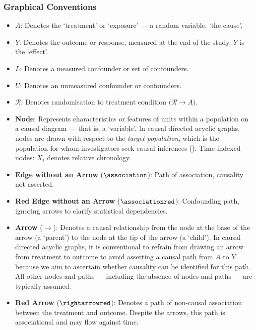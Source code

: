 \documentclass[
  single column]{article}
\begin{document}
\subsubsection{Graphical Conventions}\label{graphical-conventions}

\begin{itemize}
\item
  \textbf{\(A\)}: Denotes the `treatment' or `exposure' --- a random
  variable, `the cause'.
\item
  \textbf{\(Y\)}: Denotes the outcome or response, measured at the end
  of the study. \(Y\) is the `effect'.
\item
  \textbf{\(L\)}: Denotes a measured confounder or set of confounders.
\item
  \textbf{\(U\)}: Denotes an unmeasured confounder or confounders.
\item
  \textbf{\(\mathbf{\mathcal{R}}\)}: Denotes randomisation to treatment
  condition \(\big(\mathcal{R} \rightarrow A\big)\).
\item
  \textbf{Node}: Represents characteristics or features of units within
  a population on a causal diagram --- that is, a `variable'. In causal
  directed acyclic graphs, nodes are drawn with respect to the
  \emph{target population}, which is the population for whom
  investigators seek causal inferences (). Time-indexed nodes: \(X_t\) denotes relative
  chronology.
\item
  \textbf{Edge without an Arrow} (\(\association\)): Path of
  association, causality not asserted.
\item
  \textbf{Red Edge without an Arrow} (\(\associationred\)): Confounding
  path, ignoring arrows to clarify statistical dependencies.
\item
  \textbf{Arrow} (\(\rightarrow\)): Denotes a causal relationship from
  the node at the base of the arrow (a `parent') to the node at the tip
  of the arrow (a `child'). In causal directed acyclic graphs, it is
  conventional to refrain from drawing an arrow from treatment to
  outcome to avoid asserting a causal path from \(A\) to \(Y\) because
  we aim to ascertain whether causality can be identified for this path.
  All other nodes and paths --- including the absence of nodes and paths
  --- are typically assumed.
\item
  \textbf{Red Arrow} (\(\rightarrowred\)): Denotes a path of non-causal
  association between the treatment and outcome. Despite the arrows,
  this path is associational and may flow against time.

\end{itemize}
\end{document}

